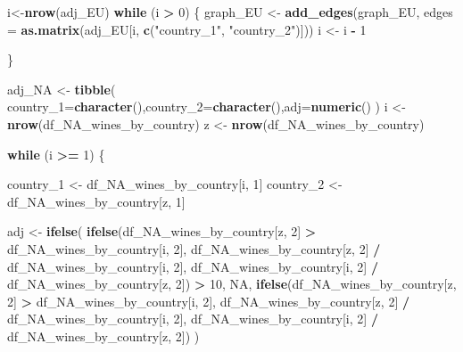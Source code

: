 \documentclass[
]{article}
\newenvironment{Shaded}{\begin{snugshade}}{\end{snugshade}}
\newcommand{\AttributeTok}[1]{\textcolor[rgb]{0.13,0.29,0.53}{#1}}
\newcommand{\ConstantTok}[1]{\textcolor[rgb]{0.56,0.35,0.01}{#1}}
\newcommand{\ControlFlowTok}[1]{\textcolor[rgb]{0.13,0.29,0.53}{\textbf{#1}}}
\newcommand{\DecValTok}[1]{\textcolor[rgb]{0.00,0.00,0.81}{#1}}
\newcommand{\FunctionTok}[1]{\textcolor[rgb]{0.13,0.29,0.53}{\textbf{#1}}}
\newcommand{\NormalTok}[1]{#1}
\newcommand{\OtherTok}[1]{\textcolor[rgb]{0.56,0.35,0.01}{#1}}
\newcommand{\SpecialCharTok}[1]{\textcolor[rgb]{0.81,0.36,0.00}{\textbf{#1}}}
\newcommand{\StringTok}[1]{\textcolor[rgb]{0.31,0.60,0.02}{#1}}
\begin{document}
\begin{Shaded}
\begin{Highlighting}[]
\NormalTok{i}\OtherTok{\textless{}{-}}\FunctionTok{nrow}\NormalTok{(adj\_EU)}
\ControlFlowTok{while}\NormalTok{ (i }\SpecialCharTok{\textgreater{}} \DecValTok{0}\NormalTok{) \{}
\NormalTok{  graph\_EU }\OtherTok{\textless{}{-}} \FunctionTok{add\_edges}\NormalTok{(graph\_EU, }\AttributeTok{edges =} \FunctionTok{as.matrix}\NormalTok{(adj\_EU[i, }\FunctionTok{c}\NormalTok{(}\StringTok{"country\_1"}\NormalTok{, }\StringTok{"country\_2"}\NormalTok{)]))}
\NormalTok{  i }\OtherTok{\textless{}{-}}\NormalTok{ i }\SpecialCharTok{{-}} \DecValTok{1}
  
\NormalTok{\}}
\end{Highlighting}
\end{Shaded}

\begin{Shaded}
\begin{Highlighting}[]
\NormalTok{adj\_NA }\OtherTok{\textless{}{-}} \FunctionTok{tibble}\NormalTok{( }\AttributeTok{country\_1=}\FunctionTok{character}\NormalTok{(),}\AttributeTok{country\_2=}\FunctionTok{character}\NormalTok{(),}\AttributeTok{adj=}\FunctionTok{numeric}\NormalTok{()}
\NormalTok{)}
\NormalTok{i }\OtherTok{\textless{}{-}} \FunctionTok{nrow}\NormalTok{(df\_NA\_wines\_by\_country)}
\NormalTok{z }\OtherTok{\textless{}{-}} \FunctionTok{nrow}\NormalTok{(df\_NA\_wines\_by\_country)}


\ControlFlowTok{while}\NormalTok{ (i }\SpecialCharTok{\textgreater{}=} \DecValTok{1}\NormalTok{) \{  }

\NormalTok{  country\_1 }\OtherTok{\textless{}{-}}\NormalTok{ df\_NA\_wines\_by\_country[i, }\DecValTok{1}\NormalTok{]}
\NormalTok{  country\_2 }\OtherTok{\textless{}{-}}\NormalTok{ df\_NA\_wines\_by\_country[z, }\DecValTok{1}\NormalTok{]}

\NormalTok{  adj }\OtherTok{\textless{}{-}} \FunctionTok{ifelse}\NormalTok{(}
    \FunctionTok{ifelse}\NormalTok{(df\_NA\_wines\_by\_country[z, }\DecValTok{2}\NormalTok{] }\SpecialCharTok{\textgreater{}}\NormalTok{ df\_NA\_wines\_by\_country[i, }\DecValTok{2}\NormalTok{],}
\NormalTok{           df\_NA\_wines\_by\_country[z, }\DecValTok{2}\NormalTok{] }\SpecialCharTok{/}\NormalTok{ df\_NA\_wines\_by\_country[i, }\DecValTok{2}\NormalTok{],}
\NormalTok{           df\_NA\_wines\_by\_country[i, }\DecValTok{2}\NormalTok{] }\SpecialCharTok{/}\NormalTok{ df\_NA\_wines\_by\_country[z, }\DecValTok{2}\NormalTok{]) }\SpecialCharTok{\textgreater{}} \DecValTok{10}\NormalTok{,}
    \ConstantTok{NA}\NormalTok{,}
    \FunctionTok{ifelse}\NormalTok{(df\_NA\_wines\_by\_country[z, }\DecValTok{2}\NormalTok{] }\SpecialCharTok{\textgreater{}}\NormalTok{ df\_NA\_wines\_by\_country[i, }\DecValTok{2}\NormalTok{],}
\NormalTok{           df\_NA\_wines\_by\_country[z, }\DecValTok{2}\NormalTok{] }\SpecialCharTok{/}\NormalTok{ df\_NA\_wines\_by\_country[i, }\DecValTok{2}\NormalTok{],}
\NormalTok{           df\_NA\_wines\_by\_country[i, }\DecValTok{2}\NormalTok{] }\SpecialCharTok{/}\NormalTok{ df\_NA\_wines\_by\_country[z, }\DecValTok{2}\NormalTok{])}
\NormalTok{  )}



\end{Highlighting}
\end{Shaded}
\end{document}
